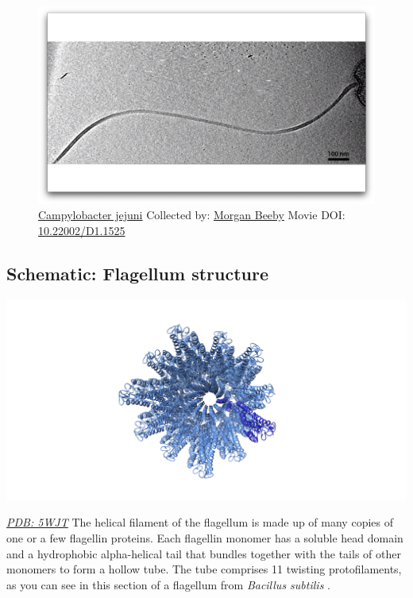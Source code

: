 \documentclass[]{tufte-book}
\begin{document}
\begin{figure}
\includegraphics{movie_stills/6_1} \caption[\protect\hyperlink{tree}{Campylobacter jejuni} Collected by:
\protect\hyperlink{morgan_beeby}{Morgan Beeby} Movie DOI:
\href{https://doi.org/10.22002/D1.1525}{10.22002/D1.1525}]{\protect\hyperlink{tree}{Campylobacter jejuni} Collected by:
\protect\hyperlink{morgan_beeby}{Morgan Beeby} Movie DOI:
\href{https://doi.org/10.22002/D1.1525}{10.22002/D1.1525}}\label{fig:6-1}
\end{figure}

\hypertarget{Flagellum_structure}{\subsection*{Schematic: Flagellum
structure}\label{Flagellum_structure}}

\includegraphics{img/schematics/6_1_1}

\href{http://rcsb.org/structure/5WJT}{\emph{PDB: 5WJT}} The helical
filament of the flagellum is made up of many copies of one or a few
flagellin proteins. Each flagellin monomer has a soluble head domain and
a hydrophobic alpha-helical tail that bundles together with the tails of
other monomers to form a hollow tube. The tube comprises 11 twisting
protofilaments, as you can see in this section of a flagellum from
\emph{Bacillus subtilis} \citep{wang2017}.
\end{document}
